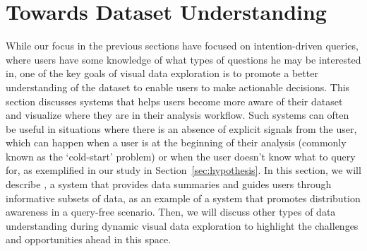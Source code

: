 \section{Towards Dataset Understanding\label{sec:understanding}}
\par While our focus in the previous sections have focused on intention-driven queries, where users have some knowledge of what types of questions he may be interested in, one of the key goals of visual data exploration is to promote a better understanding of the dataset to enable users to make actionable decisions. This section discusses systems that helps users become more aware of their dataset and visualize where they are in their analysis workflow. Such systems can often be useful in situations where there is an absence of explicit signals from the user, which can happen when a user is at the beginning of their analysis (commonly known as the `cold-start' problem) or when the user doesn't know what to query for, as exemplified in our \zv study in Section~\ref{sec:hypothesis}. In this section, we will describe \sbd, a system that provides data summaries and guides users through informative subsets of data, as an example of a system that promotes distribution awareness in a query-free scenario. Then, we will discuss other types of data understanding during dynamic visual data exploration to highlight the challenges and opportunities ahead in this space.
